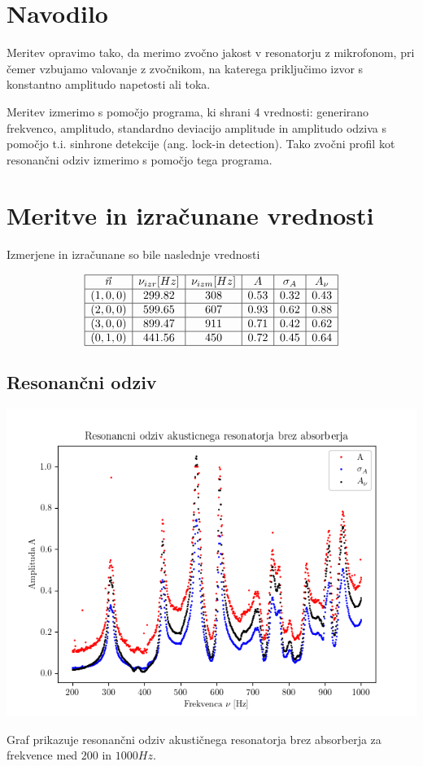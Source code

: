 \documentclass[12pt]{report}
\begin{document}
\chapter*{Navodilo}

Meritev opravimo tako, da merimo zvočno jakost v resonatorju z mikrofonom, pri čemer vzbujamo valovanje z zvočnikom, na katerega priključimo izvor s konstantno amplitudo napetosti ali toka. 

Meritev izmerimo s pomočjo programa, ki shrani 4 vrednosti: generirano frekvenco, amplitudo, standardno deviacijo amplitude in amplitudo odziva s pomočjo t.i. sinhrone detekcije (ang. lock-in detection). Tako zvočni profil kot resonančni odziv izmerimo s pomočjo tega programa. 

\endgroup


\chapter*{Meritve in izračunane vrednosti}

Izmerjene in izračunane so bile naslednje vrednosti

\[
\begin{array}{|c|c|c|c|c|c|} \hline
  \vec{n} & \nu_{izr}[Hz] & \nu_{izm}[Hz] & A & \sigma_A & A_{\nu} \\ \hline
  (1, 0, 0) & 299.82 & 308 & 0.53 & 0.32 & 0.43 \\ \hline
  (2, 0, 0) & 599.65 & 607 & 0.93 & 0.62 & 0.88 \\ \hline
  (3, 0, 0) & 899.47 & 911 & 0.71 & 0.42 & 0.62 \\ \hline
  (0, 1, 0) & 441.56 & 450 & 0.72 & 0.45 & 0.64\\ \hline
\end{array}
\]

\section*{Resonančni odziv}

\begin{slika}[H]
  \centering
  \includegraphics{01Neduseno}
  \caption{\small Graf prikazuje resonančni odziv akustičnega resonatorja brez absorberja za frekvence med $200$ in $1000Hz$. }
  \label{fig:odz_n}
\end{slika}
\end{document}
